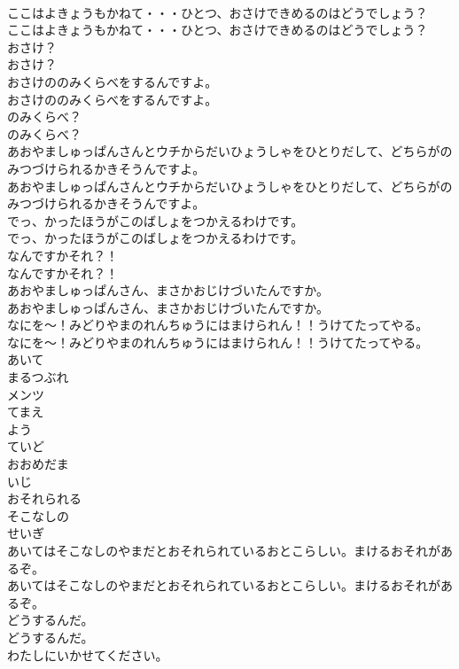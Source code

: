 \documentclass[8pt]{extreport}
\begin{document}
\begin{CJK}{UTF8}{min}
\\	ここはよきょうもかねて・・・ひとつ、おさけできめるのはどうでしょう？
\\	ここはよきょうもかねて・・・ひとつ、おさけできめるのはどうでしょう？
\\	おさけ？
\\	おさけ？
\\	おさけののみくらべをするんですよ。
\\	おさけののみくらべをするんですよ。
\\	のみくらべ？
\\	のみくらべ？
\\	あおやましゅっぱんさんとウチからだいひょうしゃをひとりだして、どちらがのみつづけられるかきそうんですよ。
\\	あおやましゅっぱんさんとウチからだいひょうしゃをひとりだして、どちらがのみつづけられるかきそうんですよ。
\\	でっ、かったほうがこのばしょをつかえるわけです。
\\	でっ、かったほうがこのばしょをつかえるわけです。
\\	なんですかそれ？！
\\	なんですかそれ？！
\\	あおやましゅっぱんさん、まさかおじけづいたんですか。
\\	あおやましゅっぱんさん、まさかおじけづいたんですか。
\\	なにを〜！みどりやまのれんちゅうにはまけられん！！うけてたってやる。
\\	なにを〜！みどりやまのれんちゅうにはまけられん！！うけてたってやる。
\\	あいて
\\	まるつぶれ
\\	メンツ
\\	てまえ
\\	よう
\\	ていど
\\	おおめだま
\\	いじ
\\	おそれられる
\\	そこなしの
\\	せいぎ
\\	あいてはそこなしのやまだとおそれられているおとこらしい。まけるおそれがあるぞ。
\\	あいてはそこなしのやまだとおそれられているおとこらしい。まけるおそれがあるぞ。
\\	どうするんだ。
\\	どうするんだ。
\\	わたしにいかせてください。

\end{CJK}
\end{document}
